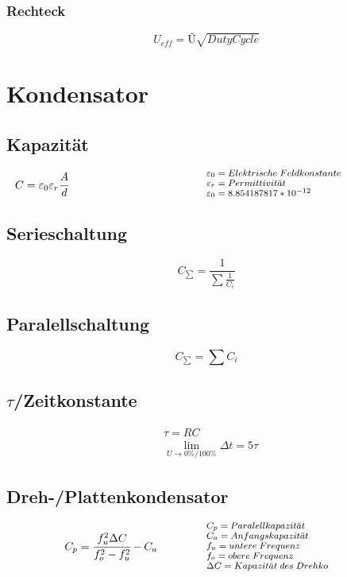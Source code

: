 \documentclass[12pt,a5paper,ngerman,titlepage]{article}
\begin{document}
\subsubsection{Rechteck}
$$U_{eff}=\text{\^{U}}\sqrt{DutyCycle}$$
\newpage
\section{Kondensator}
\subsection{Kapazität}
\[
\begin{minipage}{.5\linewidth}
	
  $C = \varepsilon_{0} \varepsilon_{r} \cfrac{A}{d}$
\end{minipage}%
\begin{minipage}{.5\linewidth}
  \fontsize{8pt}{9pt}\selectfont
  $\varepsilon_{0} = Elektrische \; Feldkonstante$ \\
  $\varepsilon_{r} = Permittivit\ddot{a}t$ \\
  $\varepsilon_{0} = 8.854187817*10^{-12}$

\end{minipage}
\]

\subsection{Serieschaltung}
$$C_{\sum} = \frac{1}{\sum \frac{1}{C_{i}}}$$

\subsection{Paralellschaltung}
$$C_{\sum} = \sum C_{i}$$

\subsection{$\tau$/Zeitkonstante}
\begin{align*}
&\tau = RC\\[5pt]
&\lim_{U \to 0\%/100\%}\Delta t = 5\tau 
\end{align*}

\subsection{Dreh-/Plattenkondensator}
\[
\begin{minipage}{.5\linewidth}
  \centering
  $C_{p}=\cfrac{f_{u}^2 \Delta C}{f_{o}^2-f_{u}^2}-C_{a}$
\end{minipage}%
\begin{minipage}{.5\linewidth}
\fontsize{8pt}{9pt}\selectfont
  $C_{p} = Paralellkapazit\ddot{a}t$ \\
  $C_{a} = Anfangskapazit\ddot{a}t$ \\
  $f_{u} = untere \; Frequenz$ \\
  $f_{o} = obere \; Frequenz$ \\
  $\Delta C = Kapazit\ddot{a}t \; des \; Drehko$ 
\end{minipage}
\]
\end{document}
